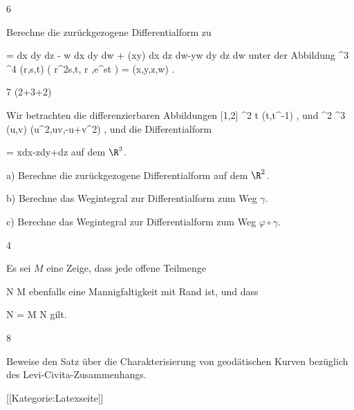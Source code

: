 {6}
{

Berechne die zurückgezogene Differentialform
\mathl{\varphi^* \tau}{} zu

\mavergleichskettedisp
{\vergleichskette
{ \tau
}
{ =} { dx \wedge dy \wedge dz - w dx \wedge dy \wedge dw + \cos (xy)  dx \wedge dz \wedge dw-yw dy \wedge dz \wedge dw
}
{ } {
}
{ } {
}
{ } {
}
}
{}{}{}
unter der Abbildung
\maabbeledisp {\varphi} { \R^3 } { \R^4
} { (r,s,t) } {  \left(  r^2s,t, \sin  r ,e^{st}  \right)  = (x,y,z,w)
} {.}

}
{} {}

{7 (2+3+2)}
{

Wir betrachten die differenzierbaren Abbildungen
\maabbeledisp {\gamma} { [1,2] } {\R^2
} { t } {(t,t^{-1})
} {,}
und
\maabbeledisp {\varphi} {\R^2} {\R^3
} {(u,v)} {(u^2,uv,-u+v^2)
} {,}
und die Differentialform

\mavergleichskettedisp
{\vergleichskette
{ \omega
}
{ =} { xdx-zdy+dz
}
{ } {
}
{ } {
}
{ } {
}
}
{}{}{}
auf dem $\R^3$.

a) Berechne die zurückgezogene Differentialform
\mathl{\varphi^* \omega}{} auf dem $\R^2$.

b) Berechne das Wegintegral zur Differentialform
\mathl{\varphi^* \omega}{} zum Weg $\gamma$.

c) Berechne
 {} {}
das Wegintegral zur Differentialform
\mathl{\omega}{} zum Weg $\varphi \circ \gamma$.

}
{} {}

{4}
{

Es sei $M$ eine
Zeige, dass jede offene Teilmenge

\mavergleichskette
{\vergleichskette
{ N
}
{ \subseteq }{ M
}
{  }{
}
{    }{
}
{   }{
}
}
{}{}{}
ebenfalls eine Mannigfaltigkeit mit
 {} {}
Rand ist, und dass

\mavergleichskettedisp
{\vergleichskette
{ \partial N
}
{ =} { \partial M \cap N
}
{ } {
}
{ } {
}
{ } {
}
}
{}{}{}
gilt.

}
{} {}

{8}
{

Beweise den Satz über die Charakterisierung von geodätischen Kurven bezüglich des Levi-Civita-Zusammenhangs.

}
{} {}

 [[Kategorie:Latexseite]]
